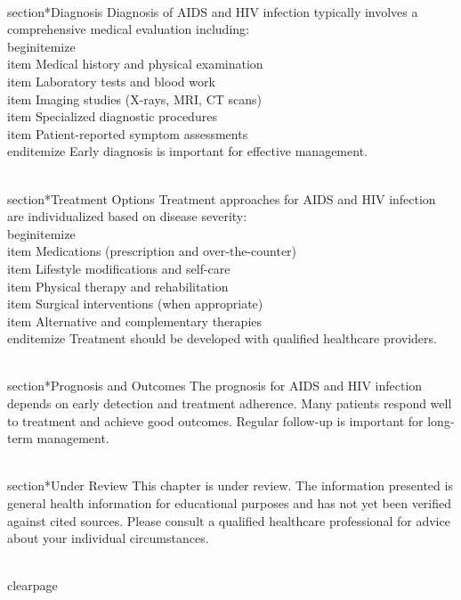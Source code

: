 \\section*{Diagnosis}
Diagnosis of AIDS and HIV infection typically involves a comprehensive medical evaluation including:
\\begin{itemize}
  \\item Medical history and physical examination
  \\item Laboratory tests and blood work
  \\item Imaging studies (X-rays, MRI, CT scans)
  \\item Specialized diagnostic procedures
  \\item Patient-reported symptom assessments
\\end{itemize}
Early diagnosis is important for effective management.

\\section*{Treatment Options}
Treatment approaches for AIDS and HIV infection are individualized based on disease severity:
\\begin{itemize}
  \\item Medications (prescription and over-the-counter)
  \\item Lifestyle modifications and self-care
  \\item Physical therapy and rehabilitation
  \\item Surgical interventions (when appropriate)
  \\item Alternative and complementary therapies
\\end{itemize}
Treatment should be developed with qualified healthcare providers.

\\section*{Prognosis and Outcomes}
The prognosis for AIDS and HIV infection depends on early detection and treatment adherence. Many patients respond well to treatment and achieve good outcomes. Regular follow-up is important for long-term management.

\\section*{Under Review}
This chapter is under review. The information presented is general health information for educational purposes and has not yet been verified against cited sources. Please consult a qualified healthcare professional for advice about your individual circumstances.

\\clearpage
